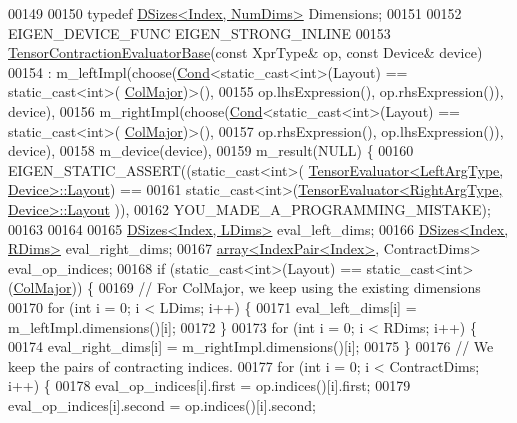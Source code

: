 \begin{DoxyCode}
00149 
00150   \textcolor{keyword}{typedef} \hyperlink{struct_eigen_1_1_d_sizes}{DSizes<Index, NumDims>} Dimensions;
00151 
00152   EIGEN\_DEVICE\_FUNC EIGEN\_STRONG\_INLINE
00153   \hyperlink{struct_eigen_1_1_tensor_contraction_evaluator_base}{TensorContractionEvaluatorBase}(\textcolor{keyword}{const} XprType& op, \textcolor{keyword}{const} Device& device)
00154     : m\_leftImpl(choose(\hyperlink{struct_eigen_1_1_cond}{Cond}<static\_cast<int>(Layout) == static\_cast<int>(
      \hyperlink{group__enums_ggaacded1a18ae58b0f554751f6cdf9eb13a0cbd4bdd0abcfc0224c5fcb5e4f6669a}{ColMajor})>(),
00155                           op.lhsExpression(), op.rhsExpression()), device),
00156     m\_rightImpl(choose(\hyperlink{struct_eigen_1_1_cond}{Cond}<static\_cast<int>(Layout) == static\_cast<int>(
      \hyperlink{group__enums_ggaacded1a18ae58b0f554751f6cdf9eb13a0cbd4bdd0abcfc0224c5fcb5e4f6669a}{ColMajor})>(),
00157                           op.rhsExpression(), op.lhsExpression()), device),
00158         m\_device(device),
00159         m\_result(NULL) \{
00160     EIGEN\_STATIC\_ASSERT((static\_cast<int>(
      \hyperlink{struct_eigen_1_1_tensor_evaluator}{TensorEvaluator<LeftArgType, Device>::Layout}) ==
00161                static\_cast<int>(\hyperlink{struct_eigen_1_1_tensor_evaluator}{TensorEvaluator<RightArgType, Device>::Layout}
      )),
00162                         YOU\_MADE\_A\_PROGRAMMING\_MISTAKE);
00163 
00164 
00165     \hyperlink{struct_eigen_1_1_d_sizes}{DSizes<Index, LDims>} eval\_left\_dims;
00166     \hyperlink{struct_eigen_1_1_d_sizes}{DSizes<Index, RDims>} eval\_right\_dims;
00167     \hyperlink{class_eigen_1_1array}{array<IndexPair<Index>}, ContractDims> eval\_op\_indices;
00168     \textcolor{keywordflow}{if} (static\_cast<int>(Layout) == static\_cast<int>(\hyperlink{group__enums_ggaacded1a18ae58b0f554751f6cdf9eb13a0cbd4bdd0abcfc0224c5fcb5e4f6669a}{ColMajor})) \{
00169       \textcolor{comment}{// For ColMajor, we keep using the existing dimensions}
00170       \textcolor{keywordflow}{for} (\textcolor{keywordtype}{int} i = 0; i < LDims; i++) \{
00171         eval\_left\_dims[i] = m\_leftImpl.dimensions()[i];
00172       \}
00173       \textcolor{keywordflow}{for} (\textcolor{keywordtype}{int} i = 0; i < RDims; i++) \{
00174         eval\_right\_dims[i] = m\_rightImpl.dimensions()[i];
00175       \}
00176       \textcolor{comment}{// We keep the pairs of contracting indices.}
00177       \textcolor{keywordflow}{for} (\textcolor{keywordtype}{int} i = 0; i < ContractDims; i++) \{
00178         eval\_op\_indices[i].first = op.indices()[i].first;
00179         eval\_op\_indices[i].second = op.indices()[i].second;

\end{DoxyCode}
